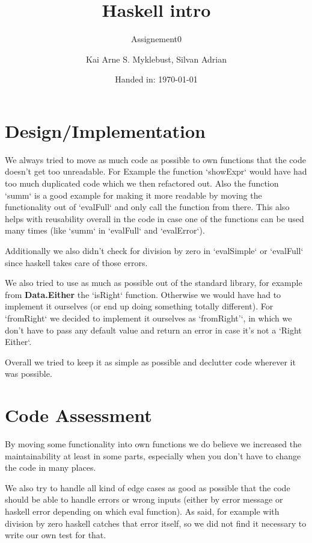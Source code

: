 \documentclass[12pt,a4paper]{article}
\begin{document}
\title{Haskell intro}
\subtitle{Assignement0}

\author{Kai Arne S. Myklebust, Silvan Adrian}
\date{Handed in: \today}
	
\maketitle
\tableofcontents

\section{Design/Implementation}
We always tried to move as much code as possible to own functions that the code doesn't get too unreadable.
For Example the function `showExpr` would have had too much duplicated code which we then refactored out.
Also the function `summ` is a good example for making it more readable by moving the functionality out of `evalFull` and only call the function from there.
This also helps with reusability overall in the code in case one of the functions can be used many times (like `summ` in `evalFull` and `evalError`).

Additionally we also didn't check for division by zero in `evalSimple` or `evalFull` since haskell takes care of those errors.

We also tried to use as much as possible out of the standard library, for example from \textbf{Data.Either} the `isRight` function. Otherwise we would have had to implement it ourselves (or end up doing something totally different). For `fromRight` we decided to implement it ourselves as `fromRight'`, in which we don't have to pass any default value and return an error in case it's not a `Right Either`.

Overall we tried to keep it as simple as possible and declutter code wherever it was possible.


\section{Code Assessment}

By moving some functionality into own functions we do believe we increased the maintainability at least in some parts, especially when you don't have to change the code in many places.

We also try to handle all kind of edge cases as good as possible that the code should be able to handle errors or wrong inputs (either by error message or haskell error depending on which eval function). As said, for example with division by zero haskell catches that error itself, so we did not find it necessary to write our own test for that.
\end{document}
